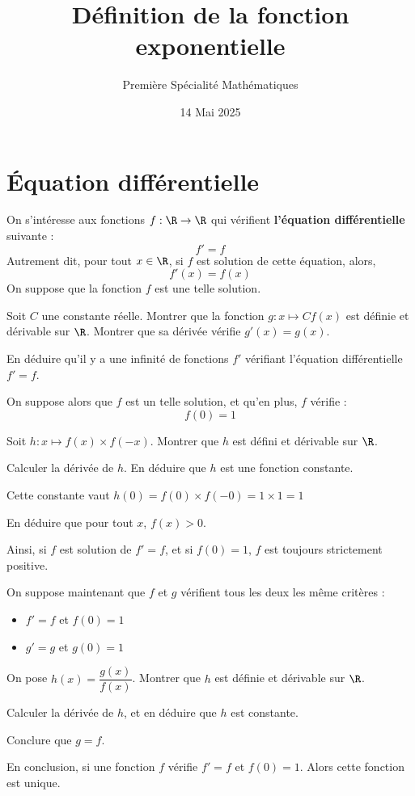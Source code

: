 \documentclass{article}
\title{Définition de la fonction exponentielle}
\date{14 Mai 2025}
\author{Première Spécialité Mathématiques}
\begin{document}
\maketitle
\section{Équation différentielle}
On s'intéresse aux fonctions $f : \R \to \R$ qui vérifient \textbf{l'équation différentielle} suivante :
\begin{equation*}
f' = f
\end{equation*}
Autrement dit, pour tout $x \in \R$, si $f$ est solution de cette équation, alors,
\begin{equation*}
f'(x) = f(x)
\end{equation*}
On suppose que la fonction $f$ est une telle solution.
\begin{enumquestions}
\item Soit $C$ une constante réelle. Montrer que la fonction $g : x \mapsto Cf(x)$ est définie et dérivable sur $\R$. Montrer que sa dérivée vérifie $g'(x) = g(x)$.
\item En déduire qu'il y a une infinité de fonctions $f'$ vérifiant l'équation différentielle $f' = f$.

On suppose alors que $f$ est un telle solution, et qu'en plus, $f$ vérifie :
\begin{equation*}
f(0) = 1
\end{equation*}
\item Soit $h : x \mapsto f(x) \times f(-x)$. Montrer que $h$ est défini et dérivable sur $\R$.
\item Calculer la dérivée de $h$. En déduire que $h$ est une fonction constante.

Cette constante vaut $h(0) = f(0) \times f(- 0) = 1 \times 1 = 1$

\item En déduire que pour tout $x$, $f(x) > 0$.

Ainsi, si $f$ est solution de $f' = f$, et si $f(0) = 1$, $f$ est toujours strictement positive.

On suppose maintenant que $f$ et $g$ vérifient tous les deux les même critères :
\begin{itemize}
\item $f' = f$ et $f(0) = 1$
\item $g' = g$ et $g(0) = 1$
\end{itemize}
\item On pose $h(x) = \dfrac{g(x)}{f(x)}$. Montrer que $h$ est définie et dérivable sur $\R$.
\item Calculer la dérivée de $h$, et en déduire que $h$ est constante.
\item Conclure que $g = f$.
\end{enumquestions}
En conclusion, si une fonction $f$ vérifie $f' = f$ et $f(0) = 1$. Alors cette fonction est unique.
\end{document}
